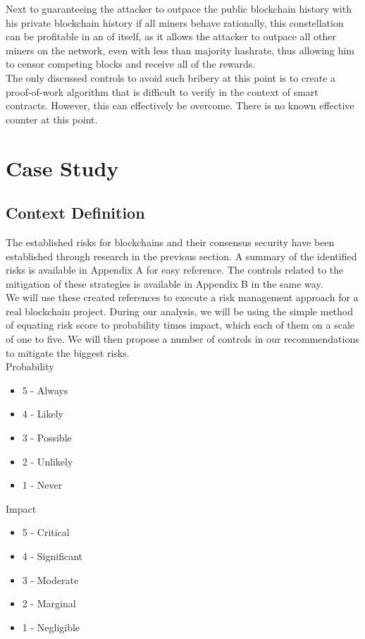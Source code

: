 \documentclass[12pt,a4paper]{article}
\begin{document}
Next to guaranteeing the attacker to outpace the public blockchain history with his private blockchain history if all miners behave rationally, this constellation can be profitable in an of itself, as it allows the attacker to outpace all other miners on the network, even with less than majority \gls{hashrate}, thus allowing him to censor competing blocks and receive all of the rewards.\\

The only discussed controls to avoid such bribery at this point is to create a proof-of-work algorithm that is difficult to verify in the context of smart contracts. However, this can effectively be overcome. There is no known effective counter at this point.\\

\section{Case Study}

\subsection{Context Definition}

The established risks for \gls{blockchain}s and their \gls{consensus} security have been established through research in the previous section. A summary of the identified risks is available in Appendix A for easy reference. The controls related to the mitigation of these strategies is available in Appendix B in the same way.\\

We will use these created references to execute a risk management approach for a real blockchain project. During our analysis, we will be using the simple method of equating risk score to probability times impact, which each of them on a scale of one to five. We will then propose a number of controls in our recommendations to mitigate the biggest risks.\\

Probability
\begin{itemize}
  \item 5 - Always
  \item 4 - Likely
  \item 3 - Possible
  \item 2 - Unlikely
  \item 1 - Never
\end{itemize}

Impact
\begin{itemize}
  \item 5 - Critical
  \item 4 - Significant
  \item 3 - Moderate
  \item 2 - Marginal
  \item 1 - Negligible
\end{itemize}
\end{document}
